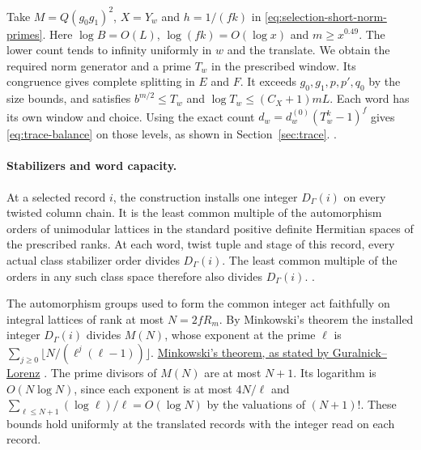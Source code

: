 Take \(M=Q(g_0g_1)^2\), \(X=Y_w\) and \(h=1/(fk)\) in
\eqref{eq:selection-short-norm-primes}. Here \(\log B=O(L)\),
\(\log(fk)=O(\log x)\) and \(m\ge x^{0.49}\). The lower count tends
to infinity uniformly in \(w\) and the translate. We obtain the
required norm generator and a prime \(T_w\) in the prescribed window.
Its congruence gives complete splitting in \(E\) and \(F\).
It exceeds \(g_0,g_1,p,p',q_0\) by the size bounds, and satisfies
\(b^{m/2}\le T_w\) and \(\log T_w\le(C_X+1)mL\). Each word has its
own window and choice. Using the exact count
\(d_w=d_w^{(0)}(T_w^k-1)^f\) gives \eqref{eq:trace-balance} on those
levels, as shown in Section~\ref{sec:trace}.
.

\paragraph{Stabilizers and word capacity.}
%
At a selected record \(i\), the construction installs one integer
\(D_\Gamma(i)\) on every twisted column chain. It is the least common
multiple of the automorphism orders of unimodular lattices in the
standard positive definite Hermitian spaces of the prescribed ranks.
At each word, twist tuple and stage of this record, every actual class
stabilizer order divides \(D_\Gamma(i)\). The least common multiple
of the orders in any such class space therefore also divides
\(D_\Gamma(i)\).
.

The automorphism groups used to form the common integer act faithfully on
integral lattices of rank at most \(N=2fR_m\). By Minkowski's theorem the
installed integer \(D_\Gamma(i)\) divides \(M(N)\), whose exponent at the
prime \(\ell\) is \(\sum_{j\ge0}\lfloor N/(\ell^j(\ell-1))\rfloor\).
\href{https://arxiv.org/pdf/math/0511191\#page=2}{Minkowski's theorem, as stated by Guralnick--Lorenz}
.
The prime divisors of \(M(N)\) are at most \(N+1\). Its logarithm is
\(O(N\log N)\), since each exponent is at most \(4N/\ell\) and
\(\sum_{\ell\le N+1}(\log\ell)/\ell=O(\log N)\) by the valuations of
\((N+1)!\). These bounds hold uniformly at the translated records
with the integer read on each record.

